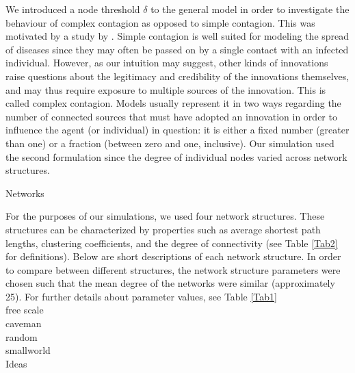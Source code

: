 \documentclass{beamer}
\begin{document}
\begin{frame}

We introduced a node threshold $\delta$ to the general model in order to investigate the behaviour of complex contagion as opposed to simple contagion. This was motivated by a study by \citet*{CM2007}. Simple contagion is well suited for modeling the spread of diseases since they may often be passed on by a single contact with an infected individual. However, as our intuition may suggest, other kinds of innovations raise questions about the legitimacy and credibility of the innovations themselves, and may thus require exposure to multiple sources of the innovation. This is called complex contagion. Models usually represent it in two ways regarding the number of connected sources that must have adopted an innovation in order to influence the agent (or individual) in question: it is either a fixed number (greater than one) or a fraction (between zero and one, inclusive). Our simulation used the second formulation since the degree of individual nodes varied across network structures.
\end{frame}
%
\begin{frame}
{Networks}

For the purposes of our simulations, we used four network structures. These structures can be characterized by properties such as average shortest path lengths, clustering coefficients, and the degree of connectivity (see Table \ref{Tab2} for definitions). Below are short descriptions of each network structure. In order to compare between different structures, the network structure parameters were chosen such that the mean degree of the networks were similar (approximately 25). For further details about parameter values, see Table \ref{Tab1}\\
free scale\\
caveman\\
random\\
smallworld\\
{Ideas}
\end{frame}
%
\end{document}
